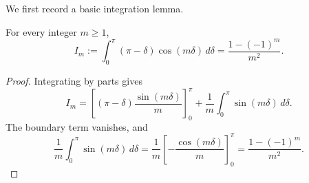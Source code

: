 We first record a basic integration lemma.

\begin{lemma}
	\label{lem:app-Im}
	For every integer \(m\ge 1\),
	\begin{equation}
		I_m:=\int_0^\pi (\pi-\delta)\cos(m\delta)\,d\delta
		=
		\frac{1-(-1)^m}{m^2}.
		\label{eq:app-Im}
	\end{equation}
\end{lemma}

\begin{proof}
	Integrating by parts gives
	\[
		I_m
		=
		\left[(\pi-\delta)\frac{\sin(m\delta)}{m}\right]_0^\pi
		+
		\frac1m\int_0^\pi \sin(m\delta)\,d\delta.
	\]
	The boundary term vanishes, and
	\[
		\frac1m\int_0^\pi \sin(m\delta)\,d\delta
		=
		\frac1m\left[-\frac{\cos(m\delta)}{m}\right]_0^\pi
		=
		\frac{1-(-1)^m}{m^2}.
	\]
\end{proof}

